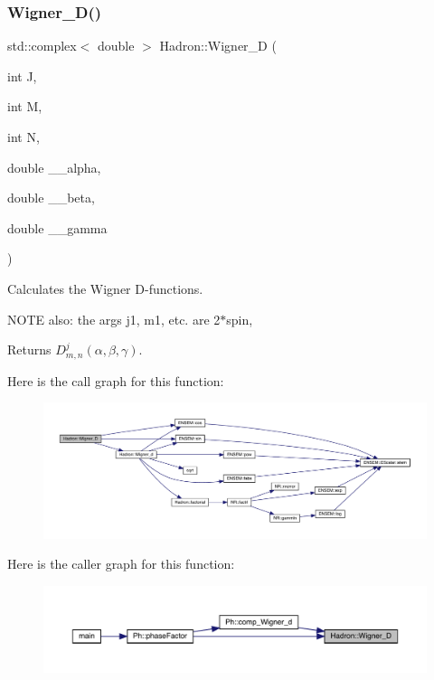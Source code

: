 \subsubsection{\texorpdfstring{Wigner\_D()}{Wigner\_D()}}
{\footnotesize\ttfamily std\+::complex$<$ double $>$ Hadron\+::\+Wigner\+\_\+D (\begin{DoxyParamCaption}\item[{int}]{J,  }\item[{int}]{M,  }\item[{int}]{N,  }\item[{double}]{\+\_\+\+\_\+alpha,  }\item[{double}]{\+\_\+\+\_\+beta,  }\item[{double}]{\+\_\+\+\_\+gamma }\end{DoxyParamCaption})}

Calculates the Wigner D-\/functions.

N\+O\+TE also\+: the args j1, m1, etc. are 2$\ast$spin,

\begin{DoxyReturn}{Returns}
$D^{j}_{m,n}(\alpha, \beta, \gamma)$. 
\end{DoxyReturn}
Here is the call graph for this function\+:\nopagebreak
\begin{figure}[H]
\begin{center}
\leavevmode
\includegraphics[width=350pt]{d1/daf/namespaceHadron_a4d99a17c00bdddfc88a14c0571b74338_cgraph}
\end{center}
\end{figure}
Here is the caller graph for this function\+:
\nopagebreak
\begin{figure}[H]
\begin{center}
\leavevmode
\includegraphics[width=350pt]{d1/daf/namespaceHadron_a4d99a17c00bdddfc88a14c0571b74338_icgraph}
\end{center}
\end{figure}
\mbox{\label{namespaceHadron_aeadf04c31606521c48ee674d28e2ca3e}} 
